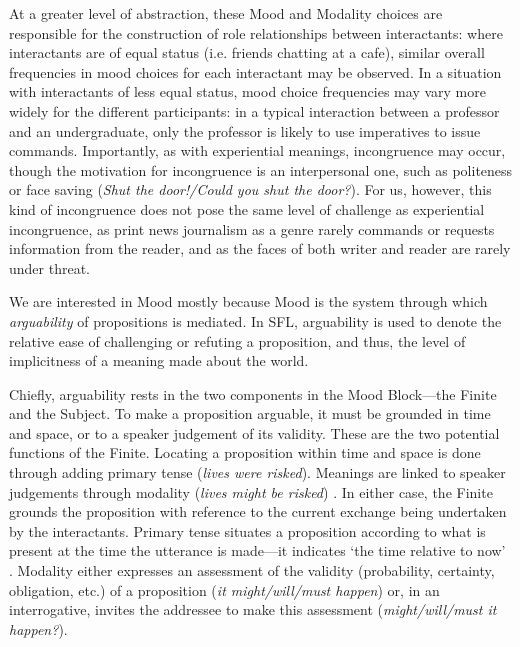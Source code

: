 
		At a greater level of abstraction, these Mood and Modality choices are responsible for the construction of role relationships between interactants: where interactants are of equal status (i.e. friends chatting at a cafe), similar overall frequencies in mood choices for each interactant may be observed. In a situation with interactants of less equal status, mood choice frequencies may vary more widely for the different participants: in a typical interaction between a professor and an undergraduate, only the professor is likely to use imperatives to issue commands. Importantly, as with experiential meanings, incongruence may occur, though the motivation for incongruence is an interpersonal one, such as politeness or face saving (\emph{Shut the door!/Could you shut the door?}). For us, however, this kind of incongruence does not pose the same level of challenge as experiential incongruence, as print news journalism as a genre rarely commands or requests information from the reader, and as the faces of both writer and reader are rarely under threat.

		We are interested in Mood mostly because Mood is the system through which \emph{arguability} of propositions is mediated. In SFL, arguability is used to denote the relative ease of challenging or refuting a proposition, and thus, the level of implicitness of a meaning made about the world.

		Chiefly, arguability rests in the two components in the Mood Block---the Finite and the Subject. To make a proposition arguable, it must be grounded in time and space, or to a speaker judgement of its validity. These are the two potential functions of the Finite. Locating a proposition within time and space is done through adding primary tense (\emph{lives were risked}). Meanings are linked to speaker judgements through modality (\emph{lives might be risked}) \cite[p.~116]{halliday_introduction_2004}. In either case, the Finite grounds the proposition with reference to the current exchange being undertaken by the interactants. Primary tense situates a proposition according to what is present at the time the utterance is made---it indicates `the time relative to now' \cite[p.~116]{halliday_introduction_2004}. Modality either expresses an assessment of the validity (probability, certainty, obligation, etc.) of a proposition (\emph{it might/will/must happen}) or, in an interrogative, invites the addressee to make this assessment (\emph{might/will/must it happen?}).


